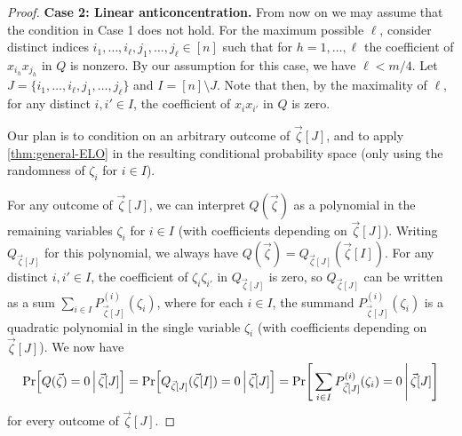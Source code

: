 \documentclass[english]{article}
\theoremstyle{remark}
\numberwithin{equation}{section}
\numberwithin{figure}{section}
\begin{document}
\begin{proof}
\textbf{Case 2: Linear anticoncentration.} From now on we may assume that the condition in Case 1 does not hold. For the maximum possible $\ell$, consider distinct indices $i_1,\dots,i_\ell,j_1,\dots,j_\ell\in [n]$ such that for $h=1,\dots,\ell$ the coefficient of $x_{i_h}x_{j_h}$ in $Q$ is nonzero. By our assumption for this case, we have $\ell<m/4$. Let $J=\{i_1,\dots,i_\ell,j_1,\dots,j_\ell\}$ and $I=[n]\setminus J$. Note  that then, by the maximality of $\ell$, for any distinct $i,i'\in I$, the coefficient of $x_ix_{i'}$ in $Q$ is zero.

Our plan is to condition on an arbitrary outcome of $\vec \zeta[J]$, and to apply \cref{thm:general-ELO} in the resulting conditional probability space (only using the randomness of $\zeta_i$ for $i\in I$).

For any outcome of $\vec \zeta[J]$, we can interpret $Q(\vec \zeta)$ as a polynomial in the remaining variables $\zeta_i$ for $i\in I$ (with coefficients depending on $\vec\zeta[J]$). Writing $Q_{\vec \zeta[J]}$ for this polynomial, we always have $Q(\vec \zeta)=Q_{\vec \zeta[J]}(\vec \zeta[I])$. For any distinct $i,i'\in I$, the coefficient of $\zeta_i\zeta_{i'}$ in $Q_{\vec \zeta[J]}$ is zero, so $Q_{\vec \zeta[J]}$ can be written as a sum $\sum_{i\in I} P^{(i)}_{\vec \zeta[J]}(\zeta_i)$, where for each $i\in I$, the summand $P^{(i)}_{\vec \zeta[J]}(\zeta_i)$ is a quadratic polynomial in the single variable $\zeta_i$ (with coefficients depending on $\vec \zeta[J]$). We now have
\[\Pr\Bigl[Q(\vec \zeta)=0\,\Big|\,\vec \zeta[J]\Bigr]=\Pr\Bigl[Q_{\vec \zeta[J]}(\vec \zeta[I])=0\,\Big|\,\vec \zeta[J]\Bigr]=\Pr\Biggl[\,\sum_{i\in I} P^{(i)}_{\vec \zeta[J]}(\zeta_i)=0\,\Bigg|\,\vec \zeta[J]\Biggr]\]
for every outcome of $\vec \zeta[J]$.


\end{proof}
\end{document}

